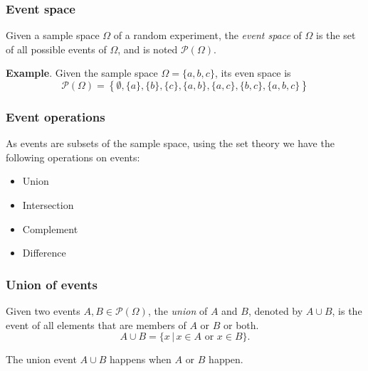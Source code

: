 \begin{frame}
\frametitle{Event space}
\begin{definition} Given a sample space $\Omega$ of a random experiment, the \emph{event space} of
$\Omega$ is the set of all possible events of $\Omega$, and is noted $\mathcal{P}(\Omega)$.
\end{definition}

\textbf{Example}. Given the sample space $\Omega=\{a,b,c\}$, its even space is 
\[
\mathcal{P}(\Omega)=\left\{\emptyset, \{a\},\{b\},\{c\},\{a,b\},\{a,c\},\{b,c\},\{a,b,c\}\right\}
\]
\end{frame}


\begin{frame}
\frametitle{Event operations}
As events are subsets of the sample space, using the set theory we have the following operations on events:
\begin{itemize}
\item Union
\item Intersection
\item Complement
\item Difference
\end{itemize}
\end{frame}


\begin{frame}
\frametitle{Union of events}
\begin{definition}
Given two events $A,B\in \mathcal{P}(\Omega)$, the \emph{union} of $A$ and $B$, denoted by $A\cup B$, is the event of
all elements that are members of $A$ or $B$ or both.
\[
A\cup B = \{x\,|\, x\in A\textrm{ or }x\in B\}.
\]
\end{definition}

\begin{center}

\end{center}
The union event $A\cup B$ happens when $A$ \alert{or} $B$ happen.
\end{frame}


